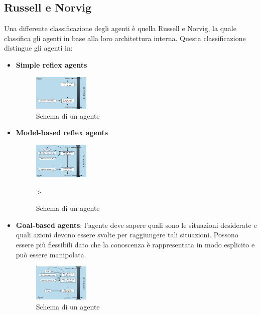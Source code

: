 \subsection{Russell e Norvig}
Una differente classificazione degli agenti è quella Russell e Norvig, la quale
classifica gli agenti in base alla loro architettura interna. Questa classificazione
distingue gli agenti in:
\begin{itemize}
    \item \textbf{Simple reflex agents}
          \begin{figure}[!ht]
              \centering
              \includegraphics[width=0.25\textwidth]{./img/Agenti/SimpleReflexAgents.png}
              \caption{Schema di un agente}
              \label{fig:simpleReflex}
          \end{figure}
    \item \textbf{Model-based reflex agents}
          \begin{figure}[!ht]
              \centering
              \includegraphics[width=0.25\textwidth]{./img/Agenti/ModelBasedReflexAgent.png}
              \caption{Schema di un agente}
              \label{fig:ModelReflex}>
          \end{figure}
    \item \textbf{Goal-based agents}: l'agente deve sapere quali sono le
          situazioni desiderate e quali azioni devono essere svolte per raggiungere
          tali situazioni. Possono essere più flessibili dato che la conoscenza
          è rappresentata in modo esplicito e può essere manipolata. 
          \begin{figure}[!ht]
              \centering
              \includegraphics[width=0.25\textwidth]{./img/Agenti/GlobalBasedAgent.png}
              \caption{Schema di un agente}

\end{figure}
\end{itemize}
